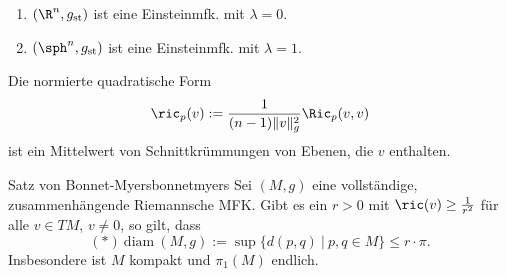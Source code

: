 \begin{beispiele}
\begin{enumerate}
\item $(\R^n, g_\text{st})$ ist eine Einsteinmfk. mit $\lambda = 0$.
\item $(\sph^n, g_\text{st})$ ist eine Einsteinmfk. mit $\lambda = 1$.
\end{enumerate}
\end{beispiele}
\begin{definition}{}{}
Die normierte quadratische Form
\begin{equation}
\ric_p(v) := \frac{1}{(n-1)\|v\|^2_g} \Ric_p(v,v)
\end{equation}
ist ein Mittelwert von Schnittkrümmungen von Ebenen, die $v$ enthalten.
\end{definition}
\begin{theorem}{Satz von Bonnet-Myers}{bonnetmyers}
Sei $(M,g)$ eine vollständige, zusammenhängende Riemannsche MFK. Gibt es ein $r > 0$ mit $\ric (v) \geq \frac{1}{r^2}$ für alle $v \in TM$, $v \neq 0$, so gilt, dass
\begin{equation}
(\ast) \ \text{diam} \ (M,g) := \sup \{ d(p,q) \ | \ p,q \in M \} \leq r \cdot \pi.
\end{equation}
Insbesondere ist $M$ kompakt und $\pi_1(M)$ endlich.
\end{theorem}
